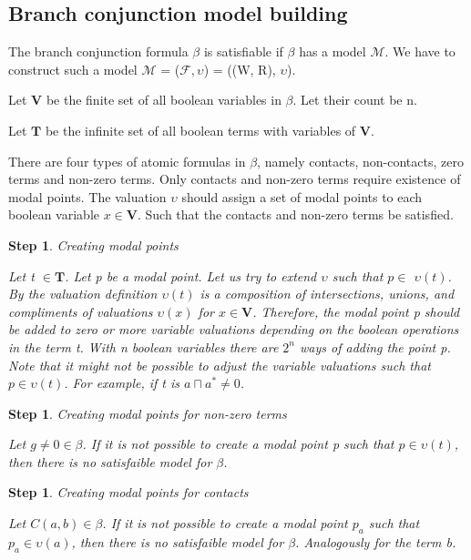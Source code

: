 \documentclass{article}
\newcommand\M{\mathcal{M}}
\newcommand\F{\mathcal{F}}
\newcommand\Tb{\mathbf{T}}
\newcommand\Vb{\mathbf{V}}
\newtheorem{step}[theorem]{Step}
\begin{document}
	\subsection{Branch conjunction model building}
		The branch conjunction formula $\beta$ is satisfiable if $\beta$ has a model $\M$. We have to construct such a model $\M$ = ($\F, \upsilon$) = ((W, R), $\upsilon$).

		Let $\Vb$ be the finite set of all boolean variables in $\beta$. Let their count be n.

		Let $\Tb$ be the infinite set of all boolean terms with variables of $\Vb$.

		There are four types of atomic formulas in $\beta$, namely contacts, non-contacts, zero terms and non-zero terms. Only contacts and non-zero terms require existence of modal points. The valuation $\upsilon$ should assign a set of modal points to each boolean variable $x \in \Vb$. Such that the contacts and non-zero terms be satisfied.

	\begin{step} Creating modal points

		Let t $\in \Tb$. Let p be a modal point. Let us try to extend $\upsilon$ such that $p \in$ $\upsilon(t)$. By the valuation definition  $\upsilon(t)$ is a composition of intersections, unions, and compliments of valuations $\upsilon(x)$ for $x \in \Vb$. Therefore, the modal point p should be added to zero or more variable valuations depending on the boolean operations in the term t. With n boolean variables there are $2^n$ ways of adding the point p. Note that it might not be possible to adjust the variable valuations such that $p \in \upsilon(t)$. For example, if t is $a \sqcap a^* \neq 0$.
	\end{step}

	\begin{step} Creating modal points for non-zero terms

		Let $g \neq 0 \in \beta$. If it is not possible to create a modal point p such that $p \in \upsilon(t)$, then there is no satisfaible model for $\beta$.
	\end{step}

	\begin{step} Creating modal points for contacts

		Let $C(a,b) \in \beta$. If it is not possible to create a modal point $p_a$ such that $p_a \in \upsilon(a)$, then there is no satisfaible model for $\beta$. Analogously for the term b.
	\end{step}
\end{document}

